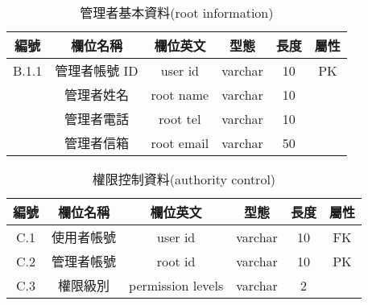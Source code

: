 \begin{table}[H]
\caption{管理者基本資料(root information)}
\label{tab:管理者基本資料}
\renewcommand{\arraystretch}{1} %
\arrayrulewidth=0.5pt               %
\centering
\begin{tabular}[t]{|c|c|c|c|c|c|}  %
\hline
編號 & 欄位名稱 & 欄位英文 & 型態 & 長度 & 屬性 \\
\hline
B.1.1 & 管理者帳號 ID & user id & varchar & 10 & PK \\
\hline
& 管理者姓名 & root name & varchar & 10 & \\
\hline
& 管理者電話 & root tel & varchar & 10 & \\
\hline
& 管理者信箱 & root email & varchar & 50 & \\
\hline
\end{tabular}
\end{table}

\begin{table}[H]
\caption{權限控制資料(authority control)}
\label{tab:權限控制資料}
\renewcommand{\arraystretch}{1} %
\arrayrulewidth=0.5pt               %
\centering
\begin{tabular}[t]{|c|c|c|c|c|c|}  %
\hline
編號 & 欄位名稱 & 欄位英文 & 型態 & 長度 & 屬性 \\
\hline
C.1 & 使用者帳號 & user id & varchar & 10 & FK \\
\hline
C.2 & 管理者帳號 & root id & varchar & 10 & PK \\
\hline
C.3 & 權限級別 & permission levels & varchar & 2 & \\
\hline
\end{tabular}
\end{table}

